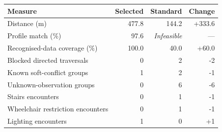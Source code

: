 \begin{tabular}{@{}lrrr@{}}
\toprule Measure & Selected & Standard & Change \\
\midrule
Distance (m) & 477.8 & 144.2 & +333.6 \\
Profile match (\%) & 97.6 & \textit{Infeasible} & --- \\
Recognised-data coverage (\%) & 100.0 & 40.0 & +60.0 \\
Blocked directed traversals & 0 & 2 & -2 \\
Known soft-conflict groups & 1 & 2 & -1 \\
Unknown-observation groups & 0 & 6 & -6 \\
Stairs encounters & 0 & 1 & -1 \\
Wheelchair restriction encounters & 0 & 1 & -1 \\
Lighting encounters & 1 & 0 & +1 \\
\bottomrule
\end{tabular}

